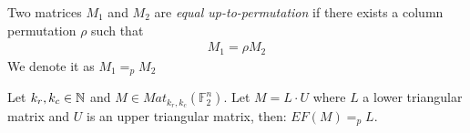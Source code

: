 \documentclass[11pt]{llncs}
\begin{document}
\begin{definition}
   Two matrices $M_1$ and $M_2$ are \textit{equal up-to-permutation} if there exists a column permutation $\rho$ such that
    \begin{align*}
        M_1 = \rho M_2
    \end{align*}
    We denote it as $M_1 =_p M_2$
\end{definition}

\begin{remark}\label{rem:rowEchelonForm}
    Let $k_r, k_c \in \mathbb{N}$ and $M\in Mat_{k_r,k_c}(\mathbb{F}_2^n)$. Let $M = L\cdot U$ where $L$ a lower triangular matrix and $U$ is an upper triangular matrix, then: $EF(M) =_p L$.
\end{remark}
\end{document}
